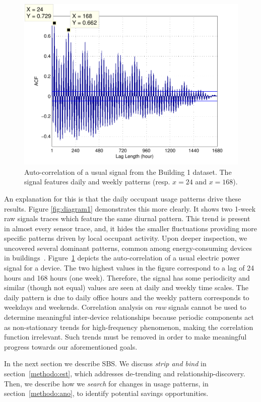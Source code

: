 \begin{figure}[t!]
\begin{center}
\includegraphics[width=.5\textwidth]{figs/acf_101A1_GHP-eps-converted-to.pdf}
\caption{Auto-correlation of a usual signal from the Building 1 dataset.
The signal features daily and weekly patterns (resp. $x=24$ and $x=168$).}
\label{fig:autocorr}
\end{center}
\end{figure}

An explanation for this is that the daily occupant usage patterns %
drive these results.
Figure \ref{fig:diagram1} demonstrates this more clearly.  It shows two 1-week raw signals traces which feature the same 
diurnal pattern.  
This trend is present in almost every sensor trace, and, it hides 
the smaller fluctuations providing more specific patterns driven by local occupant activity.  Upon deeper inspection, we uncovered several
 dominant patterns, common among energy-consuming devices in buildings~\cite{wrinch:pes2012}.  Figure~\ref{fig:autocorr} depicts the 
 auto-correlation of a usual electric power signal for a device.  The two highest values in the figure correspond to a lag of 24 hours and 168 hours (one week).  
 Therefore, the signal has some periodicity and similar (though not equal) values are seen at daily and weekly time scales.
The daily pattern is due to daily office hours and the weekly pattern corresponds to weekdays and weekends.  
Correlation analysis on \emph{raw} signals cannot be used to determine meaningful 
inter-device relationships because periodic components act as non-stationary trends for high-frequency phenomenon, 
 making the correlation function irrelevant.  %
Such trends must be removed in order to make meaningful progress towards our aforementioned goals.  

In the next section we describe SBS.  
We discuss \emph{strip and bind} in section~\ref{methodo:est}, which addresses de-trending and
relationship-discovery.  Then, we describe how we \emph{search} for changes in usage patterns, 
in section~\ref{methodo:ano}, to identify potential savings opportunities.

